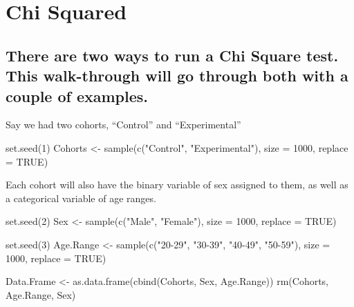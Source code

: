 \documentclass[
]{book}
\newenvironment{Shaded}{\begin{snugshade}}{\end{snugshade}}
\newcommand{\AttributeTok}[1]{\textcolor[rgb]{0.77,0.63,0.00}{#1}}
\newcommand{\ConstantTok}[1]{\textcolor[rgb]{0.00,0.00,0.00}{#1}}
\newcommand{\DecValTok}[1]{\textcolor[rgb]{0.00,0.00,0.81}{#1}}
\newcommand{\FunctionTok}[1]{\textcolor[rgb]{0.00,0.00,0.00}{#1}}
\newcommand{\NormalTok}[1]{#1}
\newcommand{\OtherTok}[1]{\textcolor[rgb]{0.56,0.35,0.01}{#1}}
\newcommand{\StringTok}[1]{\textcolor[rgb]{0.31,0.60,0.02}{#1}}
\theoremstyle{definition}
\theoremstyle{definition}
\theoremstyle{definition}
\theoremstyle{definition}
\theoremstyle{remark}
\begin{document}
\hypertarget{chi-squared}{%
\chapter{Chi Squared}\label{chi-squared}}

\hypertarget{there-are-two-ways-to-run-a-chi-square-test.-this-walk-through-will-go-through-both-with-a-couple-of-examples.}{%
\section{There are two ways to run a Chi Square test. This walk-through will go through both with a couple of examples.}\label{there-are-two-ways-to-run-a-chi-square-test.-this-walk-through-will-go-through-both-with-a-couple-of-examples.}}

Say we had two cohorts, ``Control'' and ``Experimental''

\begin{Shaded}
\begin{Highlighting}[]
\FunctionTok{set.seed}\NormalTok{(}\DecValTok{1}\NormalTok{)}
\NormalTok{Cohorts }\OtherTok{\textless{}{-}} \FunctionTok{sample}\NormalTok{(}\FunctionTok{c}\NormalTok{(}\StringTok{"Control"}\NormalTok{, }\StringTok{"Experimental"}\NormalTok{), }\AttributeTok{size =} \DecValTok{1000}\NormalTok{, }\AttributeTok{replace =} \ConstantTok{TRUE}\NormalTok{)}
\end{Highlighting}
\end{Shaded}

Each cohort will also have the binary variable of sex assigned to them, as well as a categorical variable of age ranges.

\begin{Shaded}
\begin{Highlighting}[]
\FunctionTok{set.seed}\NormalTok{(}\DecValTok{2}\NormalTok{)}
\NormalTok{Sex }\OtherTok{\textless{}{-}} \FunctionTok{sample}\NormalTok{(}\FunctionTok{c}\NormalTok{(}\StringTok{"Male"}\NormalTok{, }\StringTok{"Female"}\NormalTok{), }\AttributeTok{size =} \DecValTok{1000}\NormalTok{, }\AttributeTok{replace =} \ConstantTok{TRUE}\NormalTok{)}

\FunctionTok{set.seed}\NormalTok{(}\DecValTok{3}\NormalTok{)}
\NormalTok{Age.Range }\OtherTok{\textless{}{-}} \FunctionTok{sample}\NormalTok{(}\FunctionTok{c}\NormalTok{(}\StringTok{"20{-}29"}\NormalTok{, }\StringTok{"30{-}39"}\NormalTok{, }\StringTok{"40{-}49"}\NormalTok{, }\StringTok{"50{-}59"}\NormalTok{), }\AttributeTok{size =} \DecValTok{1000}\NormalTok{, }\AttributeTok{replace =} \ConstantTok{TRUE}\NormalTok{)}

\NormalTok{Data.Frame }\OtherTok{\textless{}{-}} \FunctionTok{as.data.frame}\NormalTok{(}\FunctionTok{cbind}\NormalTok{(Cohorts, Sex, Age.Range))}
\FunctionTok{rm}\NormalTok{(Cohorts, Age.Range, Sex)}
\end{Highlighting}
\end{Shaded}
\end{document}
